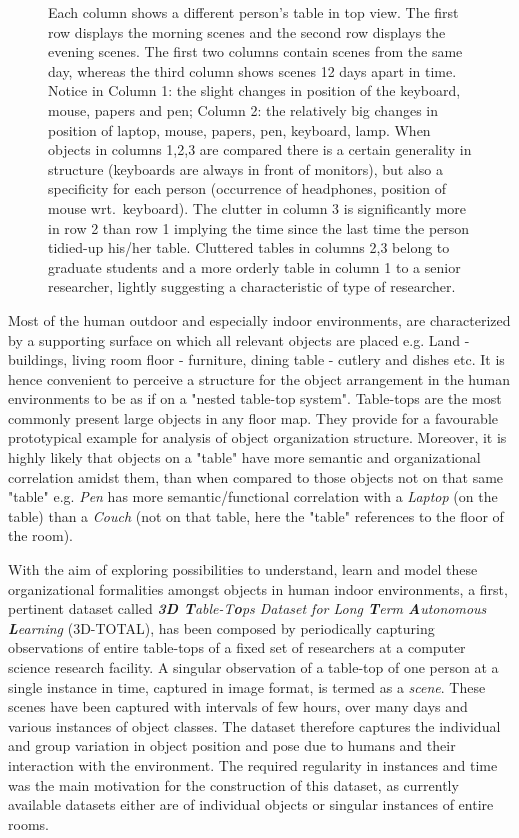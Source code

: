 \documentclass[letterpaper, 10 pt, conference]{ieeeconf}  %
\begin{document}
\begin{figure}
\begin{center}
\caption{Each column shows a different person's table in top view. The first row displays the morning scenes and the second row displays the evening scenes. The first two columns contain scenes from the same day, whereas the third column shows scenes 12 days apart in time. Notice in Column 1: the slight changes in position of the keyboard, mouse, papers and pen; Column 2: the relatively big changes in position of laptop, mouse, papers, pen, keyboard, lamp. When objects in columns 1,2,3 are compared there is a certain generality in structure (keyboards are always in front of monitors), but also a specificity for each person (occurrence of headphones, position of mouse wrt.\ keyboard). The clutter in column 3 is significantly more in row 2 than row 1 implying the time since the last time the person tidied-up his/her table. Cluttered tables in columns 2,3 belong to graduate students and a more orderly table in column 1 to a senior researcher, lightly suggesting a characteristic of type of researcher.}
\label{fig:Example Scenes}
\end{center}
\end{figure}

Most of the human outdoor and especially indoor environments, are characterized by a supporting surface on which all relevant objects are placed e.g. Land - buildings, living room floor - furniture, dining table - cutlery and dishes etc. It is hence convenient to perceive a structure for the object arrangement in the human environments to be as if on a "nested table-top system". Table-tops are the most commonly present large objects in any floor map. They provide for a favourable prototypical example for analysis of object organization structure. Moreover, it is highly likely that objects on a "table" have more semantic and organizational correlation amidst them, than when compared to those objects not on that same "table" e.g. \textit{Pen} has more semantic/functional correlation with a \textit{Laptop} (on the table) than a \textit{Couch} (not on that table, here the "table" references to the floor of the room).

With the aim of exploring possibilities to understand, learn and model these organizational formalities amongst objects in human indoor environments, a first, pertinent dataset called \textit{\textbf{3D T}able-T\textbf{o}ps Dataset for Long \textbf{T}erm \textbf{A}utonomous \textbf{L}earning} (3D-TOTAL), has been composed by periodically capturing observations of entire table-tops of a fixed set of researchers at a computer science research facility. A singular observation of a table-top of one person at a single instance in time, captured in image format, is termed as a \textit{scene}.
These scenes have been captured with intervals of few hours, over many days and various instances of object classes. The dataset therefore captures the individual and group variation in object position and pose due to humans and their interaction with the environment. The required regularity in instances and time was the main motivation for the construction of this dataset, as currently available datasets either are of individual objects or singular instances of entire rooms.
\end{document}
